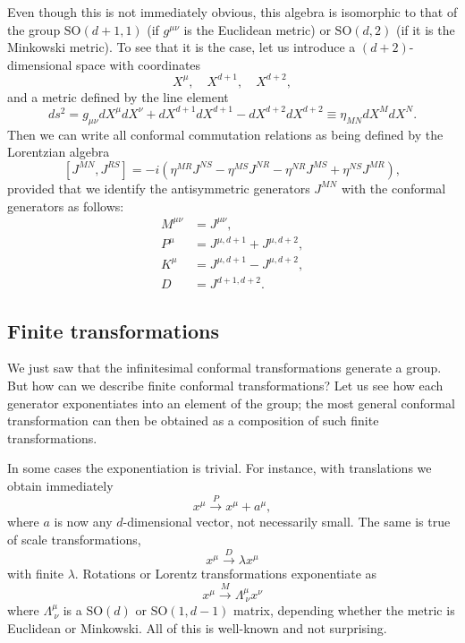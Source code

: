 \documentclass[a4paper,12pt]{article}
\newcommand{\SO}{\text{SO}}
\numberwithin{equation}{section}
\begin{document}
Even though this is not immediately obvious, this algebra is isomorphic to that of the group $\SO(d+1, 1)$ (if $g^{\mu\nu}$ is the Euclidean metric) or $\SO(d, 2)$ (if it is the Minkowski metric).
To see that it is the case, let us introduce a $(d + 2)$-dimensional space with coordinates
\begin{equation}
	X^\mu, \quad X^{d+1}, \quad X^{d+2},
\end{equation}
and a metric defined by the line element
\begin{equation}
	ds^2 = g_{\mu\nu} dX^\mu dX^\nu + dX^{d+1} dX^{d+1}
	- dX^{d+2} dX^{d+2}
	\equiv \eta_{MN} dX^M dX^N.
\end{equation}
Then we can write all conformal commutation relations as being defined by the Lorentzian algebra
\begin{equation}
	\left[ J^{MN}, J^{RS} \right]
	= -i \left( \eta^{MR} J^{NS} - \eta^{MS} J^{NR}
	- \eta^{NR} J^{MS} + \eta^{NS} J^{MR} \right),
\end{equation}
provided that we identify the antisymmetric generators $J^{MN}$ with the conformal generators as follows:
\begin{equation}
\begin{aligned}
	M^{\mu\nu} &= J^{\mu\nu},
	\\
	P^\mu &= J^{\mu, d+1} + J^{\mu, d+2},
	\\
	K^\mu &= J^{\mu, d+1} - J^{\mu, d+2},
	\\
	D &= J^{d+1, d+2}.
\end{aligned}
\label{eq:embeddingspacealgebra}
\end{equation}


\subsection{Finite transformations}

We just saw that the infinitesimal conformal transformations generate a group. But how can we describe finite conformal transformations? Let us see how each generator exponentiates into an element of the group; the most general conformal transformation can then be obtained as a composition of such finite transformations.

In some cases the exponentiation is trivial. For instance, with translations we obtain immediately
\begin{equation}
	x^\mu \xrightarrow{P} x^\mu + a^\mu,
\end{equation}
where $a$ is now any $d$-dimensional vector, not necessarily small.
The same is true of scale transformations,
\begin{equation}
	x^\mu \xrightarrow{D} \lambda x^\mu
\end{equation}
with finite $\lambda$.
Rotations or Lorentz transformations exponentiate as
\begin{equation}
	x^\mu \xrightarrow{M} \Lambda^\mu_{~\nu} x^\nu
\end{equation}
where $\Lambda^\mu_{~\nu}$ is a $\SO(d)$ or $\SO(1, d-1)$ matrix, depending whether the metric is Euclidean or Minkowski.
All of this is well-known and not surprising.
\end{document}
